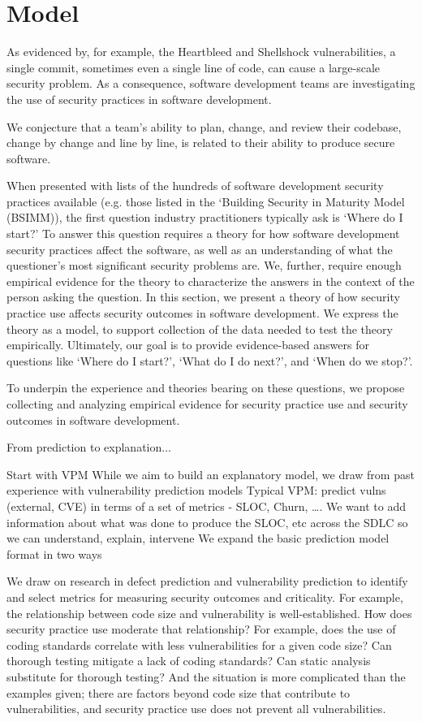 \section{Model}
\label{sec:model}
As evidenced by, for example, the Heartbleed and Shellshock vulnerabilities, a single commit, sometimes even a single line of code, can cause a large-scale security problem.  As a consequence, software development teams are investigating the use of security practices in software development. 

We conjecture that a team’s ability to plan, change, and review their codebase, change by change and line by line, is related to their ability to produce secure software.

When presented with lists of the hundreds of software development security practices available (e.g. those listed in the `Building Security in Maturity Model ~\cite{mcgraw2013bsimm} (BSIMM)), the first question industry practitioners typically ask is `Where do I start?'  To answer this question requires a theory for how software development security practices affect the software, as well as an understanding of what the questioner's most significant security problems are. We, further, require enough empirical evidence for the theory to characterize the answers in the context of the person asking the question. In this section, we present a theory of how security practice use affects security outcomes in software development. We express the theory as a model, to support collection of the data needed to test the theory empirically. Ultimately, our goal is to provide evidence-based answers for questions like `Where do I start?', `What do I do next?', and `When do we stop?'.

To underpin the experience and theories bearing on these questions, we propose collecting and analyzing empirical evidence for security practice use and security outcomes in software development. 

From prediction to explanation...

Start with VPM
While we aim to build an explanatory model, we draw from past experience with vulnerability prediction models
Typical VPM: predict vulns (external, CVE) in terms of a set of metrics - SLOC, Churn, ….
We want to add information about what was done to produce the SLOC, etc across the SDLC so we can understand, explain, intervene
We expand the basic prediction model format in two ways


We draw on research in defect prediction and vulnerability prediction to identify and select metrics for measuring security outcomes and criticality.  For example, the relationship between code size and vulnerability is well-established. How does security practice use moderate that relationship?  For example, does the use of coding standards correlate with less vulnerabilities for a given code size? Can thorough testing mitigate a lack of coding standards? Can static analysis substitute for thorough testing? And the situation is more complicated than the examples given; there are factors beyond code size that contribute to vulnerabilities, and security practice use does not prevent all vulnerabilities.  

